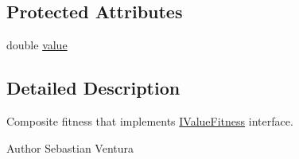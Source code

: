 \subsection*{Protected Attributes}
\begin{DoxyCompactItemize}
\item 
double \hyperlink{classnet_1_1sf_1_1jclec_1_1fitness_1_1_composite_value_fitness_a5b325c383bcdfd09c8277bafe55401bf}{value}
\end{DoxyCompactItemize}


\subsection{Detailed Description}
Composite fitness that implements \hyperlink{interfacenet_1_1sf_1_1jclec_1_1fitness_1_1_i_value_fitness}{I\-Value\-Fitness} interface.

\begin{DoxyAuthor}{Author}
Sebastian Ventura 
\end{DoxyAuthor}


